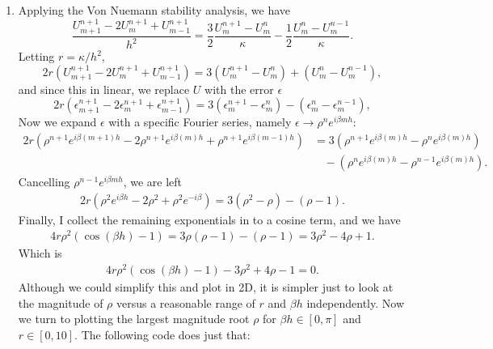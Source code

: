 \documentclass[11pt]{article}
\def\f{\frac }
\begin{document}
\begin{enumerate}
\clearpage
\pagebreak
\item Applying the Von Nuemann stability analysis, we have
\[ \f{U_{m+1} ^{n+1}-2U_{m} ^{n+1}+U_{m-1} ^{n+1}}{h^2} = \f{3}{2} \f{U_{m} ^{n+1}-U_{m} ^{n}}{\kappa} - \f{1}{2} \f{U_{m} ^{n} - U_{m} ^{n-1}}{\kappa}. \]
Letting $r = \kappa/h^2$, 
\[ 2r \left ( U_{m+1} ^{n+1}-2U_{m} ^{n+1}+U_{m-1} ^{n+1}\right )  = 3\left ( U_{m} ^{n+1}-U_{m} ^{n} \right )  + \left ( U_{m} ^{n} - U_{m} ^{n-1} \right ), \]
and since this in linear, we replace $U$ with the error $\epsilon$ 
\[ 2r \left (\epsilon_{m+1} ^{n+1}-2\epsilon_{m} ^{n+1}+\epsilon_{m-1} ^{n+1}\right )  = 3\left ( \epsilon_{m} ^{n+1}-\epsilon_{m} ^{n} \right )  - \left ( \epsilon_{m} ^{n} - \epsilon_{m} ^{n-1} \right ), \]
Now we expand $\epsilon$ with a specific Fourier series, namely $\epsilon \to \rho ^n e^{i\beta m h}$:
\begin{align*} 2r \left (\rho ^{n+1} e ^{i \beta (m+1) h}-2\rho ^{n+1} e ^{i \beta (m) h}+\rho ^{n+1} e ^{i \beta (m-1) h}\right )  &= 3\left ( \rho ^{n+1} e ^{i \beta (m) h}-\rho ^{n} e ^{i \beta (m) h}\right ) \\
&~~~~- \left ( \rho ^{n} e ^{i \beta (m) h} - \rho ^{n-1} e ^{i \beta (m) h} \right ). \end{align*}
Cancelling $\rho ^{n-1} e^{i\beta m h}$, we are left
\begin{align*} 2r \left (\rho ^{2} e ^{i \beta h}-2\rho ^{2} +\rho ^{2} e ^{-i \beta }\right )  = 3\left ( \rho ^{2} -\rho \right )- \left ( \rho - 1\right ). \end{align*}
Finally, I collect the remaining exponentials in to a cosine term, and we have
\begin{align*} 4r\rho ^{2} \left ( \cos (\beta h)-1\right )  = 3\rho \left ( \rho -1\right )- \left ( \rho - 1\right ) = 3\rho ^2 -4\rho +1 . \end{align*}
Which is
\begin{align*} 4r\rho ^{2} \left ( \cos (\beta h)-1\right )  - 3\rho ^2 +4\rho -1  = 0. \end{align*}
Although we could simplify this and plot in 2D, it is simpler just to look at the magnitude of $\rho$ versus a reasonable range of $r$ and $\beta h$ independently.
Now we turn to plotting the largest magnitude root $\rho$ for $\beta h \in [0,\pi]$ and $r \in [0,10]$.
The following code does just that:




\end{enumerate}
\end{document}
